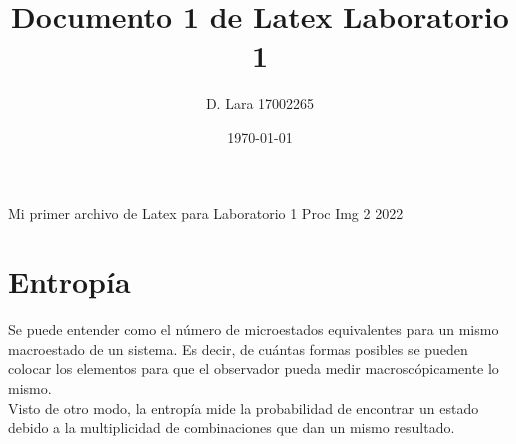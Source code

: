 \documentclass{article}[12pt, letterpaper]
\title{Documento 1 de Latex Laboratorio 1}
\author{D. Lara 17002265}
\date{\today}
\begin{document}
	\maketitle
	Mi primer archivo de Latex para Laboratorio 1 Proc Img 2 2022
	
	\section{Entropía} 

	Se puede entender como el número de microestados equivalentes para un mismo macroestado de un sistema. Es decir, de cuántas formas posibles se pueden colocar los elementos para que el observador pueda medir macroscópicamente lo mismo. \\ %
	
	Visto de otro modo, la entropía mide la probabilidad de encontrar un estado debido a la multiplicidad de combinaciones que dan un mismo resultado.
	
\end{document}
